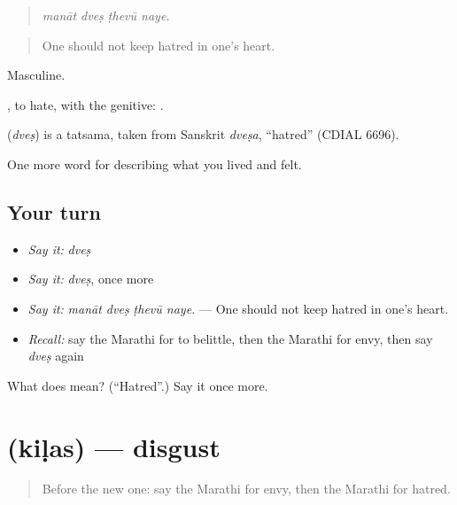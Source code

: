 \begin{quote}
\emph{manāt dveṣ ṭhevū naye.}
\end{quote}

\begin{quote}
One should not keep hatred in one's heart.
\end{quote}

Masculine.

 , to hate, with the genitive:   .

\begin{cousinweb}
\textbf{} (\emph{dveṣ}) is a tatsama, taken from Sanskrit \emph{dveṣa}, \textquotedblleft{}hatred\textquotedblright{} (CDIAL 6696).
\end{cousinweb}

\begin{grammarlens}[title={What you've built}]
One more word for describing what you lived and felt.
\end{grammarlens}

\subsection*{Your turn}
\begin{itemize}
\raggedright
  \item \emph{Say it:} \emph{dveṣ}
  \item \emph{Say it:} \emph{dveṣ}, once more
  \item \emph{Say it:} \emph{manāt dveṣ ṭhevū naye.} — One should not keep hatred in one's heart.
  \item \emph{Recall:} say the Marathi for to belittle, then the Marathi for envy, then say \emph{dveṣ} again
\end{itemize}

\begin{tcolorbox}[breakable,colback=teal!4,colframe=teal!35!black,title={Before you move on}]
What does  mean? (\textquotedblleft{}Hatred\textquotedblright{}.) Say it once more.
\end{tcolorbox}
\section[\texorpdfstring{\mr{किळस} (kiḷas)}{किळस (kiḷas)}]{ (kiḷas) — disgust}

\label{lesson:MR-C462-kilas}



\begin{quote}
Before the new one: say the Marathi for envy, then the Marathi for hatred.
\end{quote}

